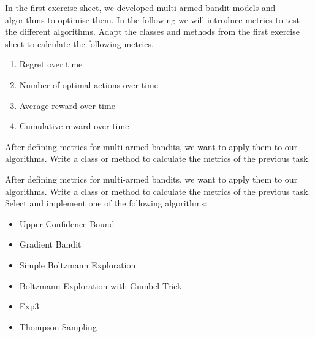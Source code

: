 \documentclass[a4paper,12pt]{report}
\begin{document}


In the first exercise sheet, we developed multi-armed bandit models and algorithms to optimise them. In the following we will introduce metrics to test the different algorithms. Adapt the classes and methods from the first exercise sheet to calculate the following metrics. 
\begin{enumerate}
	\item Regret over time
	\item Number of optimal actions over time
	\item Average reward over time
	\item Cumulative reward over time
\end{enumerate}

After defining metrics for multi-armed bandits, we want to apply them to our algorithms. Write a class or method to calculate the metrics of the previous task.


After defining metrics for multi-armed bandits, we want to apply them to our algorithms. Write a class or method to calculate the metrics of the previous task.
Select and implement one of the following algorithms:
\begin{itemize}
    \item Upper Confidence Bound
    \item Gradient Bandit
    \item Simple Boltzmann Exploration
    \item Boltzmann Exploration with Gumbel Trick
    \item Exp3 
    \item Thompson Sampling
\end{itemize}
\end{document}
